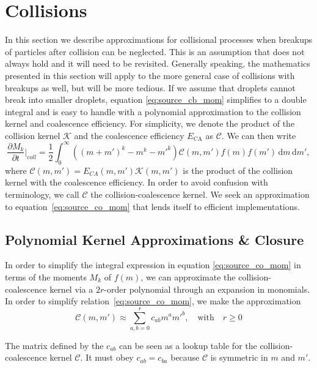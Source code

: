 \documentclass{report}
\begin{document}
\section{Collisions}
In this section we describe approximations for collisional processes when breakups of particles after collision can be neglected. This is an assumption that does not always hold and it will need to be revisited. Generally speaking, the mathematics presented in this section will apply to the more general case of collisions with breakups as well, but will be more tedious. If we assume that droplets cannot break into smaller droplets, equation \eqref{eq:source_cb_mom} simplifies to a double integral and is easy to handle with a polynomial approximation to the collision kernel and coalescence efficiency. For simplicity, we denote the product of the collision kernel $\mathcal{K}$ and the coalescence efficiency $E_\mathrm{CA}$ as $\mathcal{C}$. We can then write
\begin{equation}
    \frac{\partial M_k}{\partial t} \biggr\rvert_{coll} = \frac{1}{2}\int_0^\infty \left((m+m')^k - m^k - {m'}^k\right) \mathcal{C}(m, m')f(m)f(m') \, \text{d}m\, \text{d}m',
\label{eq:source_co_mom}
\end{equation}
where $\mathcal{C}(m, m') = E_{CA}(m, m') \mathcal{K}(m, m')$ is the product of the collision kernel with the coalescence efficiency. In order to avoid confusion with terminology, we call $\mathcal{C}$ the collision-coalescence kernel. We seek an approximation to equation~\eqref{eq:source_co_mom} that lends itself to efficient implementations.

\subsection{Polynomial Kernel Approximations \& Closure}
\label{subsec:poly_kernel_approx}
In order to simplify the integral expression in equation \eqref{eq:source_co_mom} in terms of the moments $M_k$ of $f(m)$, we can approximate the collision-coalescence kernel via a $2r$-order polynomial through an expansion in monomials. In order to simplify relation~\eqref{eq:source_co_mom}, we make the approximation
\begin{equation}
    \mathcal{C}(m,m') \approx \sum_{a,b=0}^{r} c_{ab} m^a{m'}^b, \quad \text{with} \quad r \geq 0
\label{eq:dist_approx}
\end{equation} 

 The matrix defined by the $c_{ab}$ can be seen as a lookup table for the collision-coalescence kernel $\mathcal{C}$. It must obey $c_{ab} = c_{ba}$ because $\mathcal{C}$ is symmetric in $m$ and $m'$. 
\end{document}
